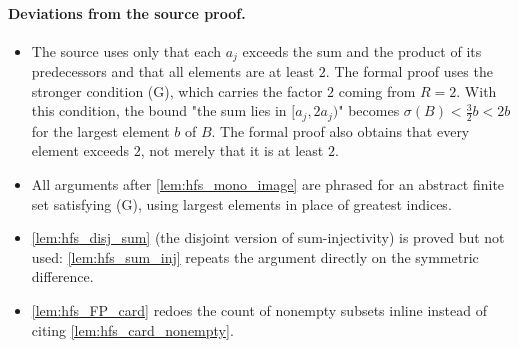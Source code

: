 \documentclass[11pt]{article}
\theoremstyle{definition}
\theoremstyle{remark}
\begin{document}
\paragraph{Deviations from the source proof.}
\begin{itemize}
 \item The source uses only that each $a_j$ exceeds the sum and the product of its predecessors and that all elements are at least $2$. The formal proof uses the stronger condition (G), which carries the factor $2$ coming from $R=2$. With this condition, the bound "the sum lies in $[a_j,2a_j)$" becomes $\sigma(B)<\tfrac32 b<2b$ for the largest element $b$ of $B$. The formal proof also obtains that every element exceeds $2$, not merely that it is at least $2$.
 \item All arguments after \cref{lem:hfs_mono_image} are phrased for an abstract finite set satisfying (G), using largest elements in place of greatest indices.
 \item \cref{lem:hfs_disj_sum} (the disjoint version of sum-injectivity) is proved but not used: \cref{lem:hfs_sum_inj} repeats the argument directly on the symmetric difference.
 \item \cref{lem:hfs_FP_card} redoes the count of nonempty subsets inline instead of citing \cref{lem:hfs_card_nonempty}.
\end{itemize}
\end{document}
